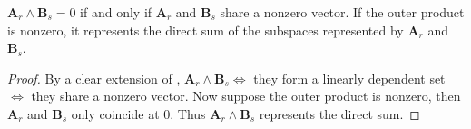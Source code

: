 \documentclass[twoside,10pt]{article}
\begin{document}
\begin{thrm}[]
$\mathbf{A}_{r} \wedge \mathbf{B}_{s} = 0$ if and only if $\mathbf{A}_{r}$ and $\mathbf{B}_{s}$ share a nonzero vector. If the outer product is nonzero, it represents the direct sum of the subspaces represented by $\mathbf{A}_r$ and $\mathbf{B}_s$.
\end{thrm}
\begin{proof}
	By a clear extension of , $\mathbf{A}_r \wedge \mathbf{B}_s \iff$ they form a linearly dependent set $\iff$ they share a nonzero vector. Now suppose the outer product is nonzero, then $\mathbf{A}_r$ and $\mathbf{B}_s$ only coincide at 0.  Thus $\mathbf{A}_r \wedge \mathbf{B}_s$ represents the direct sum.
\end{proof}
\end{document}
